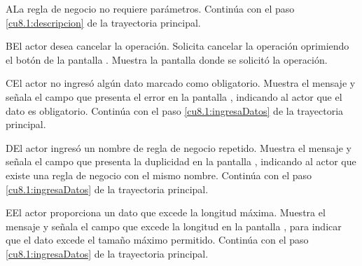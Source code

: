  
 \begin{UCtrayectoriaA}{A}{La regla de negocio no requiere parámetros.}
	\UCpaso[] Continúa con el paso \ref{cu8.1:descripcion} de la trayectoria principal.
 \end{UCtrayectoriaA}
 \begin{UCtrayectoriaA}{B}{El actor desea cancelar la operación.}
    \UCpaso[\UCactor] Solicita cancelar la operación oprimiendo el botón  de la pantalla .
    \UCpaso[\UCsist] Muestra la pantalla donde se solicitó la operación.
 \end{UCtrayectoriaA}
 \begin{UCtrayectoriaA}{C}{El actor no ingresó algún dato marcado como obligatorio.}
    \UCpaso[\UCsist] Muestra el mensaje  y señala el campo que presenta el error en la pantalla 
	    , indicando al actor que el dato es obligatorio.
    \UCpaso[] Continúa con el paso \ref{cu8.1:ingresaDatos} de la trayectoria principal.
 \end{UCtrayectoriaA}
 \begin{UCtrayectoriaA}{D}{El actor ingresó un nombre de regla de negocio repetido.}
    \UCpaso[\UCsist] Muestra el mensaje  y señala el campo que presenta la duplicidad en la pantalla 
	    , indicando al actor que existe una regla de negocio con el mismo nombre.
    \UCpaso[] Continúa con el paso \ref{cu8.1:ingresaDatos} de la trayectoria principal.
 \end{UCtrayectoriaA}
 
 \begin{UCtrayectoriaA}{E}{El actor proporciona un dato que excede la longitud máxima.}
    \UCpaso[\UCsist] Muestra el mensaje  y señala el campo que excede la 
    longitud en la pantalla , para indicar que el dato excede el tamaño máximo permitido.
    \UCpaso[] Continúa con el paso \ref{cu8.1:ingresaDatos} de la trayectoria principal.
 \end{UCtrayectoriaA}
 
